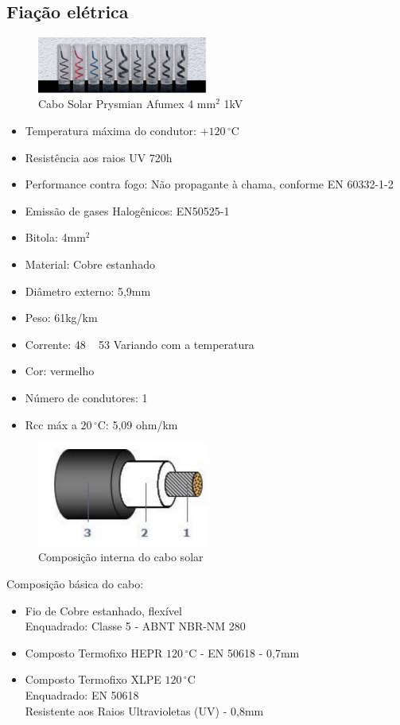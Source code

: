 \subsection{Fiação elétrica}

\begin{figure}[h]
\centering
\includegraphics[width=0.5\textwidth]{figuras/cabo.PNG}
\caption{Cabo Solar Prysmian Afumex 4 mm$^2$ 1kV}
\end{figure}

\begin{itemize}
\item Temperatura máxima do condutor: $+120\,^{\circ}\mathrm{C}$
\item Resistência aos raios UV 720h
\item Performance contra fogo: Não propagante à chama, conforme EN 60332-1-2
\item Emissão de gases Halogênicos:  EN50525-1
\item Bitola: 4mm$^2$
\item Material: Cobre estanhado
\item Diâmetro externo: 5,9mm
\item Peso: 61kg/km
\item Corrente: 48 ~ 53 Variando com a temperatura
\item Cor: vermelho
\item Número de condutores: 1
\item Rcc máx a $20\,^{\circ}\mathrm{C}$: 5,09 ohm/km
\end{itemize}

\begin{figure}[h]
\centering
\includegraphics[width=0.5\textwidth]{figuras/composicaointerna.PNG}
\caption{Composição interna do cabo solar}
\end{figure}
Composição básica do cabo:
\begin{itemize}
\item Fio de Cobre estanhado, flexível
\\Enquadrado: Classe 5 - ABNT NBR-NM 280
\item Composto Termofixo HEPR $120\,^{\circ}\mathrm{C}$ - EN 50618 - 0,7mm
\item Composto Termofixo XLPE $120\,^{\circ}\mathrm{C}$
\\Enquadrado: EN 50618
\\Resistente aos Raios Ultravioletas (UV) - 0,8mm
\end{itemize}


